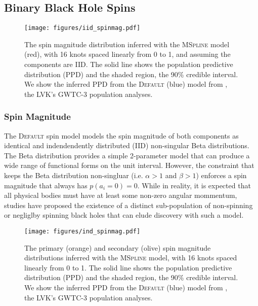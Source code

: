 \subsection{Binary Black Hole Spins} \label{sec:spin_dist}

\begin{figure}
    \texttt{[image: figures/iid\_spinmag.pdf]}
    \caption{The spin magnitude distribution inferred with the \textsc{MSpline} model (red), with 16 knots spaced linearly from 0 to 1, and 
    assuming the components are IID. The solid line shows the population predictive distribution (PPD) and the shaded region, the 90\% credible interval. 
    We show the inferred PPD from the \textsc{Default} (blue) model from \citet{o3b_astro_dist}, the LVK's GWTC-3 population analyses.}
    \label{fig:iid_spinmag_dist}
\end{figure}

\subsubsection{Spin Magnitude}

The \textsc{Default} spin model models the spin magnitude of both components as identical and indendendently distributed (IID) non-singular Beta distributions. The
Beta distribution provides a simple 2-parameter model that can produce a wide range of functional forms on the unit interval. However, the constraint that keeps 
the Beta distribution non-singluar (i.e. $\alpha>1$ and $\beta>1$) enforces a spin magnitude that always has $p(a_i=0) = 0$. While in reality, it is expected that 
all physical bodies must have at least some non-zero angular mommentum, studies have proposed the existence of a distinct sub-population of non-spinning or 
negliglby spinning black holes that can elude discovery with such a model. 

\begin{figure}
    \texttt{[image: figures/ind\_spinmag.pdf]}
    \caption{The primary (orange) and secondary (olive) spin magnitude distributions inferred with the \textsc{MSpline} model, 
    with 16 knots spaced linearly from 0 to 1. The solid line shows the population predictive distribution (PPD) and the shaded region, the 90\% credible interval. 
    We show the inferred PPD from the \textsc{Default} (blue) model from \citet{o3b_astro_dist}, the LVK's GWTC-3 population analyses.}
    \label{fig:ind_spinmag_dist}
\end{figure}

